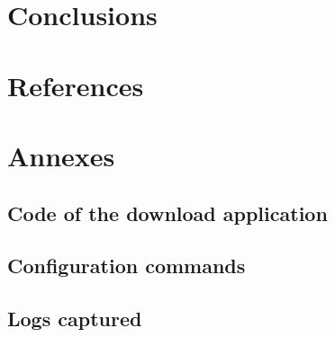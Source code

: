 \documentclass[a4paper,11pt,english]{article}
\begin{document}
\section{Conclusions}


\section{References}



\newpage
\section{Annexes}
    \subsection{Code of the download application}

    \subsection{Configuration commands}

    \subsection{Logs captured}
\end{document}
